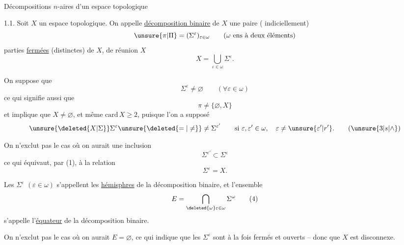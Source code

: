 \begingroup
\makeatletter\tagsleft@true\makeatother
{}
\noindent Décompositions $n$-aires d'un espace topologique

1.1. Soit $X$ un espace topologique. On appelle \uline{décomposition binaire} de $X$ une paire ( indiciellement)
\[
\unsure{\pi|\Pi}=(\Sigma^\varepsilon)_{\varepsilon\in\omega}\qquad(\omega\ \text{ens à deux éléments})
\]
  parties \uline{fermées} (distinctes) de $X$, de réunion $X$
\[
X=\bigcup_{\varepsilon\in\omega}\Sigma^\varepsilon.\tag*{(1)}
\]

On suppose que
\[
\Sigma^\varepsilon\ne\varnothing\qquad(\forall\varepsilon\in\omega)\tag*{(2)}
\]
ce qui signifie aussi que
\[
\pi\ne\{\varnothing,X\}\tag*{$(2')$}
\]
et implique que $X\ne\varnothing$, et même $\mathrm{card}\,X\geq 2$, puisque l'on a supposé
\[
\unsure{\deleted{X|\Sigma}}\Sigma^\varepsilon\unsure{\deleted{=|\ne}}\ne\Sigma^{\varepsilon'}\qquad\text{si }\varepsilon,\varepsilon'\in\omega,\quad\varepsilon\ne\unsure{\varepsilon'|r'}.\tag*{$(\unsure{3|s|\wedge})$}
\]

On n'exclut pas le cas où on aurait une inclusion
\[
\Sigma^{\varepsilon'}\subset\Sigma^\varepsilon
\]
ce qui équivaut, par (1), à la relation
\[
\Sigma^\varepsilon=X.
\]

Les $\Sigma^\varepsilon$ $(\varepsilon\in\omega)$ s'appellent les \uline{hémisphres} de la décomposition binaire,  et l'ensemble
\[
E=\bigcap_{\deleted{\omega}\varepsilon\in\omega}\Sigma^\omega\tag*{(4)}
\]
s'appelle l'\uline{équateur} de la décomposition binaire.

On n'exclut pas le cas où on aurait $E=\varnothing$, ce qui indique que les $\Sigma^\varepsilon$ \inserted{$(\varepsilon\in\omega)$} sont  à la fois fermés et ouverts -- donc que $X$ est disconnexe.
\endgroup
